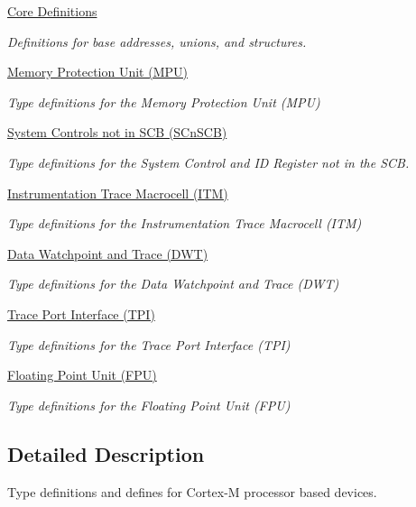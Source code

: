 \begin{DoxyCompactItemize}
\hyperlink{group___c_m_s_i_s__core__base}{Core Definitions}
\begin{DoxyCompactList}\small\item\em Definitions for base addresses, unions, and structures. \end{DoxyCompactList}\item 
\hyperlink{group___c_m_s_i_s___m_p_u}{Memory Protection Unit (\-M\-P\-U)}
\begin{DoxyCompactList}\small\item\em Type definitions for the Memory Protection Unit (M\-P\-U) \end{DoxyCompactList}\item 
\hyperlink{group___c_m_s_i_s___s_cn_s_c_b}{System Controls not in S\-C\-B (\-S\-Cn\-S\-C\-B)}
\begin{DoxyCompactList}\small\item\em Type definitions for the System Control and I\-D Register not in the S\-C\-B. \end{DoxyCompactList}\item 
\hyperlink{group___c_m_s_i_s___i_t_m}{Instrumentation Trace Macrocell (\-I\-T\-M)}
\begin{DoxyCompactList}\small\item\em Type definitions for the Instrumentation Trace Macrocell (I\-T\-M) \end{DoxyCompactList}\item 
\hyperlink{group___c_m_s_i_s___d_w_t}{Data Watchpoint and Trace (\-D\-W\-T)}
\begin{DoxyCompactList}\small\item\em Type definitions for the Data Watchpoint and Trace (D\-W\-T) \end{DoxyCompactList}\item 
\hyperlink{group___c_m_s_i_s___t_p_i}{Trace Port Interface (\-T\-P\-I)}
\begin{DoxyCompactList}\small\item\em Type definitions for the Trace Port Interface (T\-P\-I) \end{DoxyCompactList}\item 
\hyperlink{group___c_m_s_i_s___f_p_u}{Floating Point Unit (\-F\-P\-U)}
\begin{DoxyCompactList}\small\item\em Type definitions for the Floating Point Unit (F\-P\-U) \end{DoxyCompactList}\end{DoxyCompactItemize}


\subsection{Detailed Description}
Type definitions and defines for Cortex-\/\-M processor based devices. 